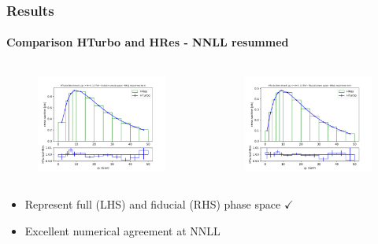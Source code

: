 \documentclass[aspectratio=43]{beamer}
\begin{document}
\begin{frame}
	
	\frametitle{Results}
	\framesubtitle{Comparison HTurbo and HRes - NNLL resummed}
	
	\begin{columns}
	
	
	\begin{figure}
		\includegraphics[width = 7cm]{plots/part3/chapter6/nnlo-res-1.png}
	\end{figure}
	
	
	\begin{figure}
		\includegraphics[width = 7cm]{plots/part3/chapter6/nnlo-res-fid-1.png}
	\end{figure}
	
	\end{columns}
	
	\begin{itemize}
	\item \footnotesize Represent full (LHS) and fiducial (RHS) phase space {\color{darkgreen}$\checkmark$} 
	\item \footnotesize Excellent numerical agreement at NNLL
	\end{itemize}

\end{frame}
\end{document}
